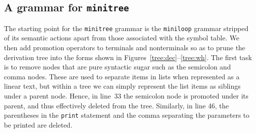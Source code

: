 \subsection{A grammar for {\tt minitree}}

The starting point for the {\tt minitree} grammar is the {\tt miniloop}
grammar stripped of its semantic actions apart from those associated
with the symbol table. We then add promotion operators to terminals and
nonterminals so as to prune the derivation tree into the forms shown in
Figures~\ref{tree:dec}--\ref{tree:wh}. The first task is to remove nodes
that are pure syntactic sugar such as the semicolon and comma nodes. These are
used to separate items in lists when represented as a linear text, but
within a tree we can simply represent the list items as siblings under a
parent node. Hence, in  line~33 the semicolon node is promoted under its
parent, and thus effectively deleted from the tree. Similarly, in line
46, the parentheses in the {\tt print} statement and the comma
separating the parameters to be printed are deleted.

